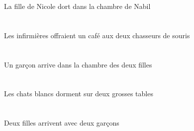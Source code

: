 \begin{exe}
 La fille de Nicole dort dans la chambre de Nabil
\ex\glll
   \DEFPlErg{}   \infirmiereAPlErg{}    \DEFDuObl{}    \INDPlObl{}   \sourisBPlObl{}   \DE{}   \chasseurCDuObl{}   \A{}   \INDSgAbs{}   \cafeCSgAbs{}  \offrirVdPstCSg{} \\
   \DEFPlErgP{}   \infirmiereAPlErgP{}    \DEFDuOblP{}    \INDPlOblP{}   \sourisBPlOblP{}   \DEP{}   \chasseurCDuOblP{}   \AP{}   \INDSgAbsP{}   \cafeCSgAbsP{}  \offrirVdPstCSgP{} \\
   \DEFPlErgG{}   \infirmiereAPlErgG{}    \DEFDuOblG{}    \INDPlOblG{}   \sourisBPlOblG{}   \DEG{}   \chasseurCDuOblG{}   \AG{}   \INDSgAbsG{}   \cafeCSgAbsG{}  \offrirVdPstCSgG{} \\
 Les infirmières offraient un café aux deux chasseurs de souris
\ex\glll
   \INDSgAbs{}   \garconDSgAbs{}    \DEFSgObl{}    \DEFDuObl{}   \filleCDuObl{}   \DE{}   \chambreBSgObl{}   \DANS{}  \arriverViPrsDSg{} \\
   \INDSgAbsP{}   \garconDSgAbsP{}    \DEFSgOblP{}    \DEFDuOblP{}   \filleCDuOblP{}   \DEP{}   \chambreBSgOblP{}   \DANSP{}  \arriverViPrsDSgP{} \\
   \INDSgAbsG{}   \garconDSgAbsG{}    \DEFSgOblG{}    \DEFDuOblG{}   \filleCDuOblG{}   \DEG{}   \chambreBSgOblG{}   \DANSG{}  \arriverViPrsDSgG{} \\
 Un garçon arrive dans la chambre des deux filles
\ex\glll
    \INDDuObl{}   \grosDDu{}   \tableDDuObl{}   \SUR{}   \DEFPlAbs{}   \blancDPl{}   \chatDPlAbs{}  \dormirViPrsDPl{} \\
    \INDDuOblP{}   \grosDDuP{}   \tableDDuOblP{}   \SURP{}   \DEFPlAbsP{}   \blancDPlP{}   \chatDPlAbsP{}  \dormirViPrsDPlP{} \\
    \INDDuOblG{}   \grosDDuG{}   \tableDDuOblG{}   \SURG{}   \DEFPlAbsG{}   \blancDPlG{}   \chatDPlAbsG{}  \dormirViPrsDPlG{} \\
 Les chats blancs dorment sur deux grosses tables
\ex\glll
    \INDDuObl{}   \garconDDuObl{}   \AVEC{}   \INDDuAbs{}   \filleCDuAbs{}  \arriverViPrsCDu{} \\
    \INDDuOblP{}   \garconDDuOblP{}   \AVECP{}   \INDDuAbsP{}   \filleCDuAbsP{}  \arriverViPrsCDuP{} \\
    \INDDuOblG{}   \garconDDuOblG{}   \AVECG{}   \INDDuAbsG{}   \filleCDuAbsG{}  \arriverViPrsCDuG{} \\
 Deux filles arrivent avec deux garçons
\ex\glll
   \DEFPlAbs{}    \INDSgObl{}   \KatishaASgObl{}   \DE{}   \filleCPlAbs{}    \INDSgObl{}   \blancBSg{}   \sourisBSgObl{}   \AVEC{}  \dormirViPrsCPl{} \\

\end{exe}
